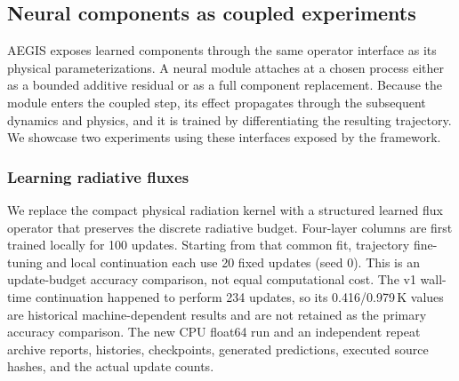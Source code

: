 \documentclass{article} %
\begin{document}


\subsection{Neural components as coupled experiments}
AEGIS exposes learned components through the same operator interface as its physical parameterizations. A neural module attaches at a chosen process either as a bounded additive residual or as a full component replacement. Because the module enters the coupled step, its effect propagates through the subsequent dynamics and physics, and it is trained by differentiating the resulting trajectory. We showcase two experiments using these interfaces exposed by the framework.




\subsubsection{Learning radiative fluxes}
We replace the compact physical radiation kernel with a structured learned flux operator that preserves the discrete radiative budget. Four-layer columns are first trained locally for 100 updates. Starting from that common fit, trajectory fine-tuning and local continuation each use 20 fixed updates (seed 0). This is an update-budget accuracy comparison, not equal computational cost. The v1 wall-time continuation happened to perform 234 updates, so its 0.416/0.979\,K values are historical machine-dependent results and are not retained as the primary accuracy comparison. The new CPU float64 run and an independent repeat archive reports, histories, checkpoints, generated predictions, executed source hashes, and the actual update counts.
\end{document}
